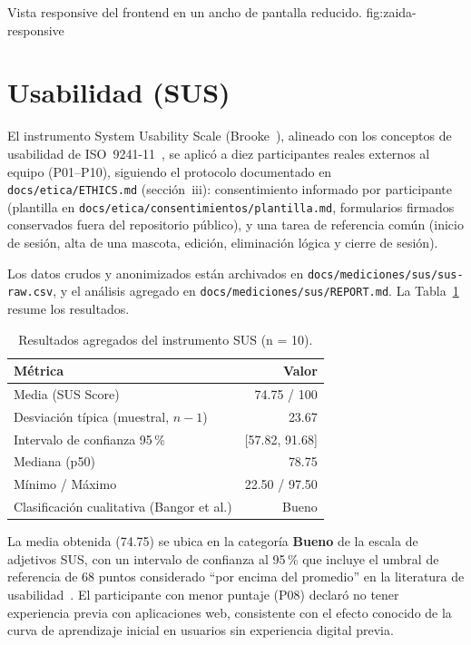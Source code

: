%
{Vista responsive del frontend en un ancho de pantalla reducido.}%
{fig:zaida-responsive}

\section{Usabilidad (SUS)}
\label{sec:zaida-sus}

El instrumento System Usability Scale (Brooke~\cite{sus-brooke1996}),
alineado con los conceptos de usabilidad de ISO~9241-11~\cite{iso9241-11},
se aplic\'o a diez participantes reales externos al equipo (P01--P10),
siguiendo el protocolo documentado en \texttt{docs/etica/ETHICS.md}
(secci\'on~iii): consentimiento informado por participante (plantilla en
\texttt{docs/etica/consentimientos/plantilla.md}, formularios firmados
conservados fuera del repositorio p\'ublico), y una tarea de referencia
com\'un (inicio de sesi\'on, alta de una mascota, edici\'on, eliminaci\'on
l\'ogica y cierre de sesi\'on).

Los datos crudos y anonimizados est\'an archivados en
\texttt{docs/mediciones/sus/sus-raw.csv}, y el an\'alisis agregado en
\texttt{docs/mediciones/sus/REPORT.md}. La Tabla~\ref{tab:zaida-sus}
resume los resultados.

\begin{table}[H]
  \centering
  \caption{Resultados agregados del instrumento SUS (n = 10).}
  \label{tab:zaida-sus}
  \begin{tabular}{lr}
    \hline
    \textbf{M\'etrica} & \textbf{Valor} \\
    \hline
    Media (SUS Score)                          & 74.75 / 100 \\
    Desviaci\'on t\'ipica (muestral, $n-1$)     & 23.67 \\
    Intervalo de confianza 95\,\%               & [57.82, 91.68] \\
    Mediana (p50)                               & 78.75 \\
    M\'inimo / M\'aximo                         & 22.50 / 97.50 \\
    Clasificaci\'on cualitativa (Bangor et al.) & Bueno \\
    \hline
  \end{tabular}
\end{table}

La media obtenida (74.75) se ubica en la categor\'ia \textbf{Bueno} de la
escala de adjetivos SUS, con un intervalo de confianza al 95\,\% que
incluye el umbral de referencia de 68 puntos considerado ``por encima del
promedio'' en la literatura de usabilidad~\cite{sus-brooke1996}. El
participante con menor puntaje (P08) declar\'o no tener experiencia previa
con aplicaciones web, consistente con el efecto conocido de la curva de
aprendizaje inicial en usuarios sin experiencia digital previa.

